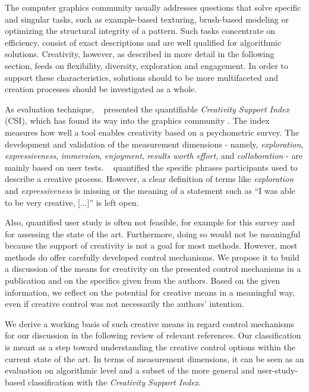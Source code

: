 The computer graphics community usually addresses questions that solve specific and singular tasks, such as example-based texturing, brush-based modeling or optimizing the structural integrity of a pattern. Such tasks concentrate on efficiency, consist of exact descriptions and are well qualified for algorithmic solutions. Creativity, however, as described in more detail in the following section, feeds on flexibility, diversity, exploration and engagement. In order to support these characteristics, solutions should to be more multifaceted and creation processes should be investigated as a whole.

As evaluation technique, \citeauthor*{cherry_2014_qcs}~\cite{cherry_2014_qcs} presented the quantifiable \textit{Creativity Support Index} (CSI), which has found its way into the graphics community \cite{shugrina_2017_ppi}. The index measures how well a tool enables creativity based on a psychometric survey. The development and validation of the measurement dimensions - namely, \textit{exploration}, \textit{expressiveness}, \textit{immersion}, \textit{enjoyment}, \textit{results worth effort}, and \textit{collaboration} - are mainly based on user tests. \citeauthor*{cherry_2014_qcs}~\cite{cherry_2014_qcs} quantified the specific phrases participants used to describe a creative process. However, a clear definition of terms like \textit{exploration} and \textit{expressiveness} is missing or the meaning of a statement such as ``I was able to be very creative, [...]'' is left open. 

Also, quantified user study is often not feasible, for example for this survey and for assessing the state of the art. Furthermore, doing so would not be meaningful because the support of creativity is not a goal for most methods. However, most methods do offer carefully developed control mechanisms. We propose it to build a discussion of the means for creativity on the presented control mechanisms in a publication and on the specifics given from the authors. Based on the given information, we reflect on the potential for creative means in a meaningful way, even if creative control was not necessarily the authors' intention. 

We derive a working basis of such creative means in regard control mechanisms for our discussion in the following review of relevant references. Our classification is meant as a step toward understanding the creative control options within the current state of the art. In terms of measurement dimensions, it can be seen as an evaluation on algorithmic level and a subset of the more general and user-study-based classification with the \textit{Creativity Support Index}. 

